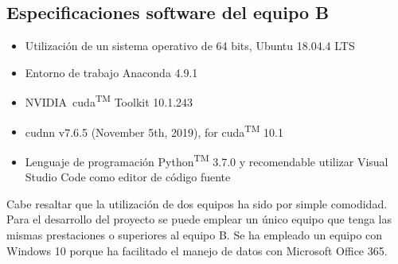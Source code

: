 \subsection{Especificaciones software del equipo B}
\label{subsec:especificaciones-software-equipob}
\begin{itemize}
    \item Utilización de un sistema operativo de 64 bits, Ubuntu 18.04.4 LTS
    \item Entorno de trabajo Anaconda 4.9.1
    \item NVIDIA\textregistered\ \acrshort{cuda}\textsuperscript{TM} Toolkit 10.1.243 
    \item \acrshort{cudnn} v7.6.5 (November 5th, 2019), for \acrshort{cuda}\textsuperscript{TM} 10.1
    \item Lenguaje de programación Python\textsuperscript{TM} 3.7.0 y recomendable utilizar Visual Studio Code como editor de código fuente
\end{itemize}

Cabe resaltar que la utilización de dos equipos ha sido por simple comodidad. Para el desarrollo del proyecto se puede emplear un único equipo que tenga las mismas prestaciones o superiores al equipo B. Se ha empleado un equipo con Windows 10 porque ha facilitado el manejo de datos con Microsoft Office 365.